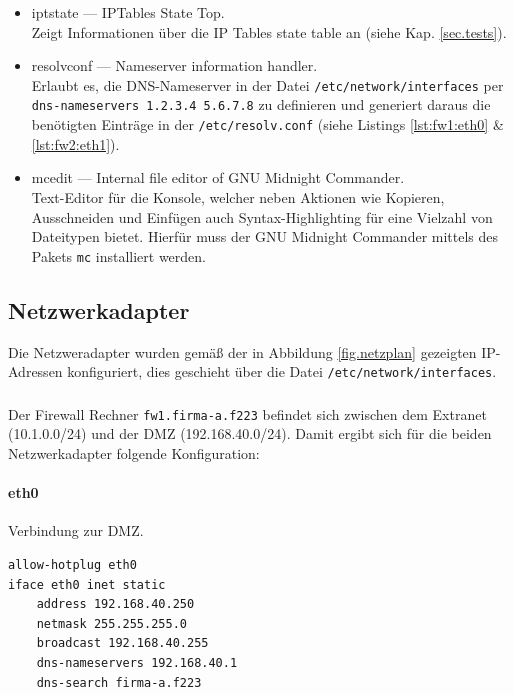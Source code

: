 \begin{itemize}
    \item iptstate --- IPTables State Top.\\
        Zeigt Informationen über die IP Tables state table an (siehe Kap.
        \ref{sec.tests}).
    \item resolvconf --- Nameserver information handler.\\
        Erlaubt es, die DNS-Nameserver in der Datei
        {\tt /etc/network/interfaces}
        per {\tt dns-nameservers 1.2.3.4 5.6.7.8} zu definieren und
        generiert daraus die benötigten Einträge in der {\tt /etc/resolv.conf}
        (siehe Listings \ref{lst:fw1:eth0} \& \ref{lst:fw2:eth1}).
    \item mcedit --- Internal file editor of GNU Midnight Commander.\\
        Text-Editor für die Konsole, welcher neben Aktionen wie Kopieren,
        Ausschneiden und Einfügen auch Syntax-Highlighting für eine Vielzahl von
        Dateitypen bietet. Hierfür muss der GNU Midnight Commander mittels des
        Pakets {\tt mc} installiert werden.
\end{itemize}


\subsection{Netzwerkadapter}\label{sec.netzwerk}

Die Netzweradapter wurden gemäß der in Abbildung \ref{fig.netzplan}
gezeigten IP-Adressen konfiguriert, dies geschieht über die Datei
{\tt /etc/network/interfaces}.

\subsubsection{\fwa}

Der Firewall Rechner {\tt fw1.firma-a.f223} befindet sich zwischen dem Extranet
(10.1.0.0/24) und der DMZ (192.168.40.0/24).
Damit ergibt sich für die beiden Netzwerkadapter folgende Konfiguration:

\paragraph{eth0} Verbindung zur DMZ.

\begin{lstlisting}[label=lst:fw1:eth0,caption={Netzwerkadapter eth0 Konfiguration.}]
allow-hotplug eth0
iface eth0 inet static
    address 192.168.40.250
    netmask 255.255.255.0
    broadcast 192.168.40.255
    dns-nameservers 192.168.40.1
    dns-search firma-a.f223
\end{lstlisting}

